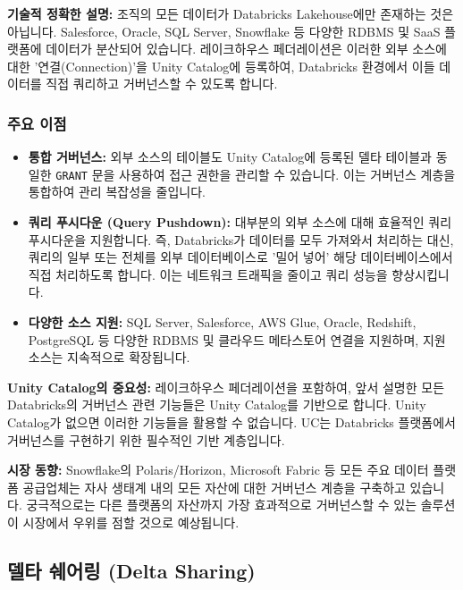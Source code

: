 \documentclass[11pt,a4paper]{article}
\begin{document}
\textbf{기술적 정확한 설명:}
조직의 모든 데이터가 Databricks Lakehouse에만 존재하는 것은 아닙니다. Salesforce, Oracle, SQL Server, Snowflake 등 다양한 RDBMS 및 SaaS 플랫폼에 데이터가 분산되어 있습니다. 레이크하우스 페더레이션은 이러한 외부 소스에 대한 '연결(Connection)'을 Unity Catalog에 등록하여, Databricks 환경에서 이들 데이터를 직접 쿼리하고 거버넌스할 수 있도록 합니다.

\subsubsection*{주요 이점}
\begin{itemize}
    \item \textbf{통합 거버넌스:} 외부 소스의 테이블도 Unity Catalog에 등록된 델타 테이블과 동일한 \texttt{GRANT} 문을 사용하여 접근 권한을 관리할 수 있습니다. 이는 거버넌스 계층을 통합하여 관리 복잡성을 줄입니다.
    \item \textbf{쿼리 푸시다운 (Query Pushdown):} 대부분의 외부 소스에 대해 효율적인 쿼리 푸시다운을 지원합니다. 즉, Databricks가 데이터를 모두 가져와서 처리하는 대신, 쿼리의 일부 또는 전체를 외부 데이터베이스로 '밀어 넣어' 해당 데이터베이스에서 직접 처리하도록 합니다. 이는 네트워크 트래픽을 줄이고 쿼리 성능을 향상시킵니다.
    \item \textbf{다양한 소스 지원:} SQL Server, Salesforce, AWS Glue, Oracle, Redshift, PostgreSQL 등 다양한 RDBMS 및 클라우드 메타스토어 연결을 지원하며, 지원 소스는 지속적으로 확장됩니다.
\end{itemize}

\begin{cautionbox}
\textbf{Unity Catalog의 중요성:}
레이크하우스 페더레이션을 포함하여, 앞서 설명한 모든 Databricks의 거버넌스 관련 기능들은 Unity Catalog를 기반으로 합니다. Unity Catalog가 없으면 이러한 기능들을 활용할 수 없습니다. UC는 Databricks 플랫폼에서 거버넌스를 구현하기 위한 필수적인 기반 계층입니다.
\end{cautionbox}

\begin{tcolorbox}[summarybox]
\textbf{시장 동향:}
Snowflake의 Polaris/Horizon, Microsoft Fabric 등 모든 주요 데이터 플랫폼 공급업체는 자사 생태계 내의 모든 자산에 대한 거버넌스 계층을 구축하고 있습니다. 궁극적으로는 다른 플랫폼의 자산까지 가장 효과적으로 거버넌스할 수 있는 솔루션이 시장에서 우위를 점할 것으로 예상됩니다.
\end{tcolorbox}

\newpage
\subsection*{델타 쉐어링 (Delta Sharing)}
\end{document}
